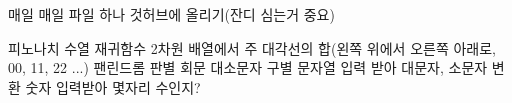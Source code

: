 매일 매일 파일 하나 것허브에 올리기(잔디 심는거 중요)

피노나치 수열 재귀함수
2차원 배열에서 주 대각선의 합(왼쪽 위에서 오른쪽 아래로, 00, 11, 22 ...)
팬린드롬 판별 회문 대소문자 구별
문자열 입력 받아 대문자, 소문자 변환
숫자 입력받아 몇자리 수인지?